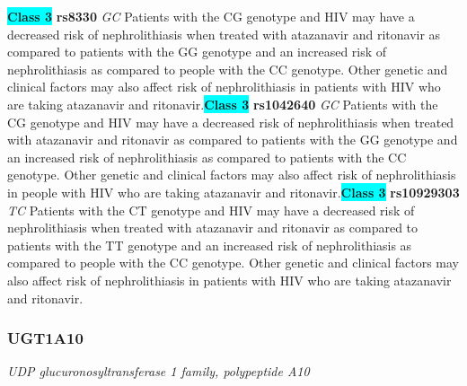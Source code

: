 \documentclass{report}
\begin{document}
\textbf{\colorbox{cyan} {Class 3}} \textbf{ rs8330 } \textit{ GC }
Patients with the CG genotype and HIV may have a decreased risk of nephrolithiasis when treated with atazanavir and ritonavir as compared to patients with the GG genotype and an increased risk of nephrolithiasis as compared to people with the CC genotype. Other genetic and clinical factors may also affect risk of nephrolithiasis in patients with HIV who are taking atazanavir and ritonavir.\newline\textbf{\colorbox{cyan} {Class 3}} \textbf{ rs1042640 } \textit{ GC }
Patients with the CG genotype and HIV may have a decreased risk of nephrolithiasis when treated with atazanavir and ritonavir as compared to patients with the GG genotype and an increased risk of nephrolithiasis as compared to patients with the CC genotype. Other genetic and clinical factors may also affect risk of nephrolithiasis in people with HIV who are taking atazanavir and ritonavir.\newline\textbf{\colorbox{cyan} {Class 3}} \textbf{ rs10929303 } \textit{ TC }
Patients with the CT genotype and HIV may have a decreased risk of nephrolithiasis when treated with atazanavir and ritonavir as compared to patients with the TT genotype and an increased risk of nephrolithiasis as compared to people with the CC genotype. Other genetic and clinical factors may also affect risk of nephrolithiasis in patients with HIV who are taking atazanavir and ritonavir. \newline\subsubsection{ UGT1A10 }
\textit{ UDP glucuronosyltransferase 1 family, polypeptide A10 }
\end{document}
